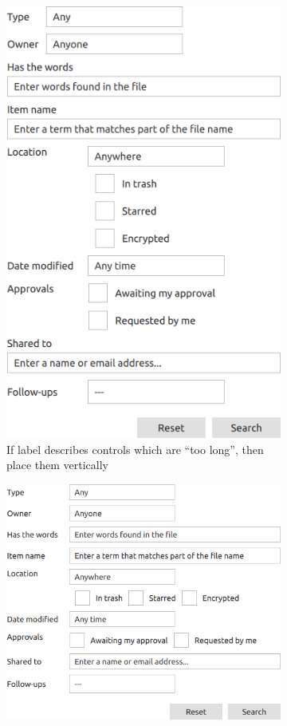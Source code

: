 \begin{figure}[t]
    \begin{subfigure}[t]{.45\textwidth}
        \vspace{-15em}
        \begin{minipage}{4cm}
        \includegraphics[scale=0.5]{google-drive-search-setting-output2.png}
        \end{minipage}
        \caption{If label describes controls which are ``too long'', then place them vertically}
    \end{subfigure}\hspace{1cm}
    \begin{subfigure}[t]{.45\textwidth}
      \includegraphics[scale=0.5]{google-drive-search-setting-output3.png}

\end{subfigure}
\end{figure}
